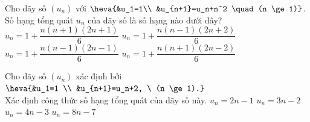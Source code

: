 \begin{ex}%
	Cho  dãy số $(u_n)$ với $\heva{&u_1=1\\
	&u_{n+1}=u_n+n^2 \quad (n \ge 1)}$. Số hạng tổng quát $u_n$ của dãy số là số hạng  nào dưới đây?
	 \choice
		{$u_n=1+\dfrac{n(n+1)(2n+1)}{6}$} 
		 {$u_n=1+\dfrac{n(n-1)(2n+2)}{6}$}
		{\True  $u_n=1+\dfrac{n(n-1)(2n-1)}{6}$}
		{$u_n=1+\dfrac{n(n+1)(2n-2)}{6}$} 
\end{ex}

\begin{ex}%
	Cho dãy  số $(u_n)$ xác định bởi $\heva{&u_1=1 \\
	&u_{n+1}=u_n+2, \ (n \ge 1).}$\\ 
	Xác định  công thức số hạng tổng quát của dãy số này.
	 \choice
		{\True $u_n = 2n  - 1$}
		{$u_n = 3n  - 2$}
		{$u_n  = 4n - 3$}
		{$u_n  = 8n - 7$}
\end{ex}

